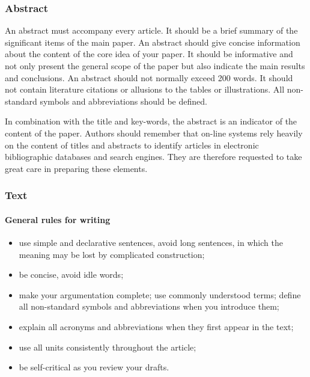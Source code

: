 \documentclass[USenglish,oneside,twocolumn]{article}
\begin{document}
\subsubsection{Abstract}

An abstract must accompany every article. It should be a brief summary of the significant items of the main paper. An abstract should give concise information about the content of the core idea of your paper. It should be informative and not only present the general scope of the paper but also indicate the main results and conclusions. An abstract should not normally exceed 200 words. It should not contain literature citations or allusions to the tables or illustrations. All non-standard symbols and abbreviations should be defined.

In combination with the title and key-words, the abstract is an indicator of the content of the paper. Authors should remember that on-line systems rely heavily on the content of titles and abstracts to identify articles in electronic bibliographic databases and search engines. They are therefore requested to take great care in preparing these elements.


\subsubsection{Text}

\paragraph{General rules for writing}
\begin{itemize}
\item use simple and declarative sentences, avoid long sentences, in which the meaning may be lost by complicated construction;
\item be concise, avoid idle words;
\item make your argumentation complete; use commonly understood terms; define all non-standard symbols and abbreviations when you introduce them;
\item explain all acronyms and abbreviations when they first appear in the text;
\item use all units consistently throughout the article;
\item be self-critical as you review your drafts.
\end{itemize}
\end{document}
